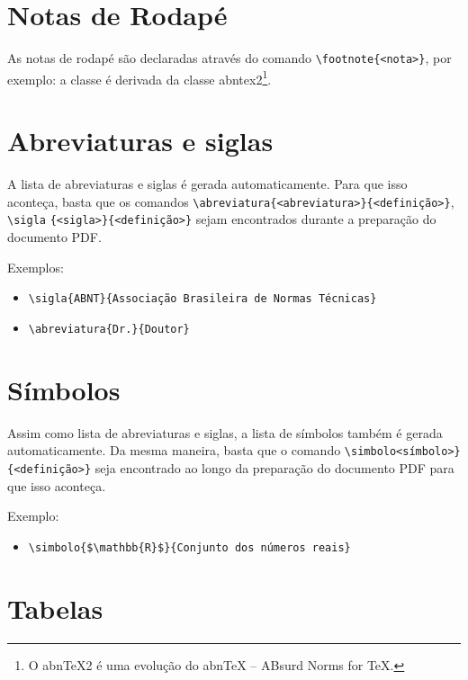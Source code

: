 \section{Notas de Rodapé}

As notas de rodapé são declaradas através do comando \verb|\footnote{<nota>}|, por exemplo: a classe \feectex é derivada da classe abntex2\footnote{O abnTeX2 é uma evolução do abnTeX -- ABsurd Norms for TeX.}.

\section{Abreviaturas e siglas}

A lista de abreviaturas e siglas é gerada automaticamente. Para que isso aconteça, basta que os comandos \verb|\abreviatura{<abreviatura>}|\verb|{<definição>}|, \verb|\sigla| \verb|{<sigla>}{<definição>}| sejam encontrados durante a preparação do documento PDF.

Exemplos:

\begin{itemize}
    \item \verb|\sigla{ABNT}{Associação Brasileira de Normas Técnicas}|
    \item \verb|\abreviatura{Dr.}{Doutor}|
\end{itemize}


\section{Símbolos}

Assim como lista de abreviaturas e siglas, a lista de símbolos também é gerada automaticamente. Da mesma maneira, basta que o comando \verb|\simbolo<símbolo>}| \verb|{<definição>}| seja encontrado ao longo da preparação do documento PDF para que isso aconteça.

Exemplo:

\begin{itemize}
    \item \verb|\simbolo{$\mathbb{R}$}{Conjunto dos números reais}|
\end{itemize}


\section{Tabelas}

